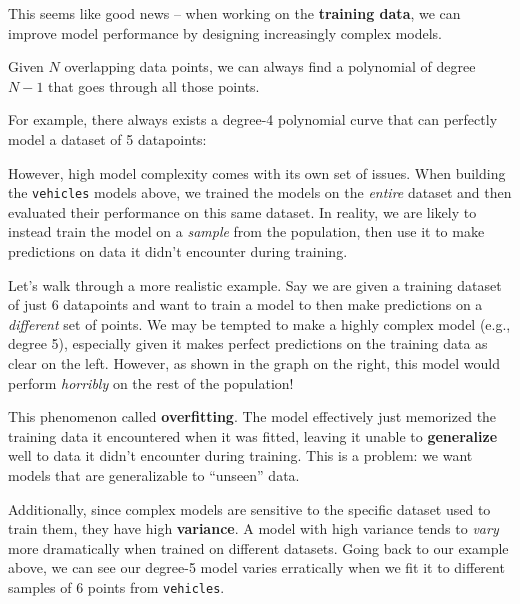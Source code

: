 \documentclass[
  letterpaper,
  DIV=11,
  numbers=noendperiod]{scrreprt}
\begin{document}
This seems like good news -- when working on the \textbf{training data},
we can improve model performance by designing increasingly complex
models.

\begin{tcolorbox}[enhanced jigsaw, colback=white, arc=.35mm, toprule=.15mm, colframe=quarto-callout-tip-color-frame, coltitle=black, opacitybacktitle=0.6, breakable, titlerule=0mm, leftrule=.75mm, left=2mm, opacityback=0, bottomtitle=1mm, rightrule=.15mm, colbacktitle=quarto-callout-tip-color!10!white, bottomrule=.15mm, title=\textcolor{quarto-callout-tip-color}{\faLightbulb}\hspace{0.5em}{Math Fact: Polynomial Degrees}, toptitle=1mm]

Given \(N\) overlapping data points, we can always find a polynomial of
degree \(N-1\) that goes through all those points.

For example, there always exists a degree-4 polynomial curve that can
perfectly model a dataset of 5 datapoints:

\end{tcolorbox}

However, high model complexity comes with its own set of issues. When
building the \texttt{vehicles} models above, we trained the models on
the \emph{entire} dataset and then evaluated their performance on this
same dataset. In reality, we are likely to instead train the model on a
\emph{sample} from the population, then use it to make predictions on
data it didn't encounter during training.

Let's walk through a more realistic example. Say we are given a training
dataset of just 6 datapoints and want to train a model to then make
predictions on a \emph{different} set of points. We may be tempted to
make a highly complex model (e.g., degree 5), especially given it makes
perfect predictions on the training data as clear on the left. However,
as shown in the graph on the right, this model would perform
\emph{horribly} on the rest of the population!

This phenomenon called \textbf{overfitting}. The model effectively just
memorized the training data it encountered when it was fitted, leaving
it unable to \textbf{generalize} well to data it didn't encounter during
training. This is a problem: we want models that are generalizable to
``unseen'' data.

Additionally, since complex models are sensitive to the specific dataset
used to train them, they have high \textbf{variance}. A model with high
variance tends to \emph{vary} more dramatically when trained on
different datasets. Going back to our example above, we can see our
degree-5 model varies erratically when we fit it to different samples of
6 points from \texttt{vehicles}.
\end{document}
